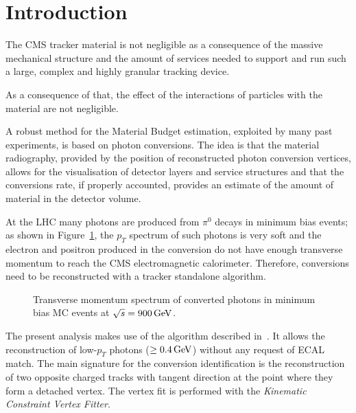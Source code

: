 \section{Introduction}
\label{introductions}

The CMS tracker material is not negligible as a consequence of the
massive mechanical structure and the amount of services needed to
support and run such a large, complex and highly granular tracking device.

As a consequence of that, the effect of the interactions of particles
with the material are not negligible. 


A robust method for the Material Budget estimation, exploited by many
past experiments, is based on photon conversions. The idea is that the
material radiography, provided by the position of reconstructed photon
conversion vertices, allows for the visualisation of detector layers
and service structures and that the conversions rate, if properly
accounted, provides an estimate of the amount of material in the
detector volume.

At the LHC many photons are produced from $\pi^0$ decays in minimum bias events; 
as shown in Figure~\ref{ptMC}, the $p_T$ spectrum of such photons is
very soft and the electron and positron produced in the conversion 
do not have enough transverse momentum to reach the CMS electromagnetic calorimeter.
Therefore, conversions need to be reconstructed with a tracker standalone algorithm.

\begin{figure}[!hbtp]
\centering
\caption{Transverse momentum spectrum of converted photons in minimum
  bias MC events at $\sqrt{s}=900{\rm \, GeV}$.}
\label{ptMC}
\end{figure}

The present analysis makes use of the algorithm described in~\cite{nancy}.
It allows the reconstruction of low-$p_T$ photons ($\geq 0.4{\rm \, GeV}$)
without any request of ECAL match. The main signature for the
conversion identification is the reconstruction of two opposite
charged tracks with tangent direction at the point where they form a
detached vertex. The vertex fit is performed with the \emph{Kinematic
  Constraint Vertex Fitter}.



